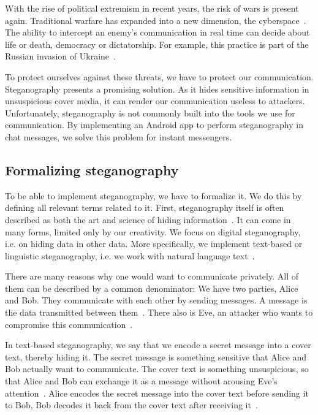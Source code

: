 With the rise of political extremism in recent years, the risk of wars is present again. Traditional warfare has expanded into a new dimension, the cyberspace~\cite{serpanosCyberwarfareUkraine2022}. The ability to intercept an enemy's communication in real time can decide about life or death, democracy or dictatorship. For example, this practice is part of the Russian invasion of Ukraine~\cite{sufiSocialMediaAnalytics2023}.

To protect ourselves against these threats, we have to protect our communication. Steganography presents a promising solution. As it hides sensitive information in unsuspicious cover media, it can render our communication useless to attackers. Unfortunately, steganography is not commonly built into the tools we use for communication. By implementing an Android app to perform steganography in chat messages, we solve this problem for instant messengers.

\subsection{Formalizing steganography}
\label{sec:formalizingSteganography}
To be able to implement steganography, we have to formalize it. We do this by defining all relevant terms related to it. First, steganography itself is often described as both the art and science of hiding information~\cite{bennettLinguisticSteganographySurvey2004,wuGenerativeTextSteganography2024}. It can come in many forms, limited only by our creativity. We focus on digital steganography, i.e. on hiding data in other data. More specifically, we implement text-based or linguistic steganography, i.e. we work with natural language text~\cite{zieglerNeuralLinguisticSteganography2019}.

There are many reasons why one would want to communicate privately. All of them can be described by a common denominator: We have two parties, Alice and Bob. They communicate with each other by sending messages. A message is the data transmitted between them~\cite{wuGenerativeTextSteganography2024}. There also is Eve, an attacker who wants to compromise this communication~\cite{al-aniOverviewMainFundamentals2010,wuGenerativeTextSteganography2024}.

In text-based steganography, we say that we encode a secret message into a cover text, thereby hiding it. The secret message is something sensitive that Alice and Bob actually want to communicate. The cover text is something unsuspicious, so that Alice and Bob can exchange it as a message without arousing Eve's attention~\cite{al-aniOverviewMainFundamentals2010}. Alice encodes the secret message into the cover text before sending it to Bob, Bob decodes it back from the cover text after receiving it~\cite{al-aniOverviewMainFundamentals2010}.

